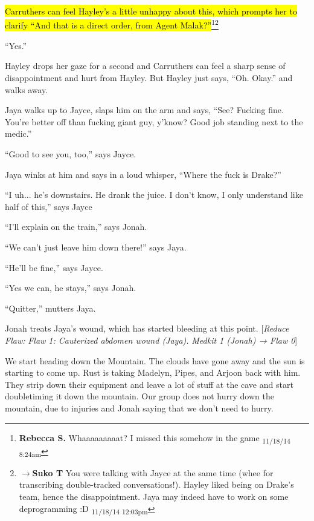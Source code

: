 \hl{Carruthers can feel Hayley's a little unhappy about this, which prompts her to clarify ``And that is a direct order, from Agent Malak?''}\footnote{\textbf{Rebecca S. }Whaaaaaaaaat? 
I missed this somehow in the game \textsubscript{11/18/14 8:24am}}\footnote{$\rightarrow$\textbf{Suko T }You were talking with Jayce at the same time (whee for transcribing double-tracked conversations!).  Hayley liked being on Drake's team, hence the disappointment.  Jaya may indeed have to work on some deprogramming :D \textsubscript{11/18/14 12:03pm}}

``Yes.''

Hayley drops her gaze for a second and Carruthers can feel a sharp sense of disappointment and hurt from Hayley.  But Hayley just says, ``Oh.  Okay.'' and walks away.



Jaya walks up to Jayce, slaps him on the arm and says, ``See?  Fucking fine.  You're better off than fucking giant guy, y'know?  Good job standing next to the medic.''

``Good to see you, too,'' says Jayce.

Jaya winks at him and says in a loud whisper, ``Where the fuck is Drake?''

``I uh... he's downstairs.   He drank the juice.  I don't know, I only understand like half of this,'' says Jayce

``I'll explain on the train,'' says Jonah.

``We can't just leave him down there!'' says Jaya.

``He'll be fine,'' says Jayce.

``Yes we can, he stays,'' says Jonah.

``Quitter,'' mutters Jaya.



Jonah treats Jaya's wound, which has started bleeding at this point.  {[}\textit{Reduce Flaw: }\textit{ {\color[RGB]{255,0,0}Flaw 1: Cauterized abdomen wound (Jaya).} }\textit{  Medkit 1 (Jonah) → Flaw 0}{]}





We start heading down the Mountain.  The clouds have gone away and the sun is starting to come up.  Rust is taking Madelyn, Pipes, and Arjoon back with him. They strip down their equipment and leave a lot of stuff at the cave and start doubletiming it down the mountain.  Our group does not hurry down the mountain, due to injuries and Jonah saying that we don't need to hurry.



